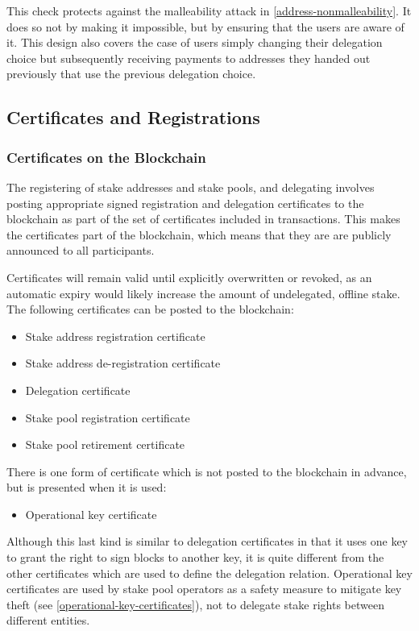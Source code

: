 \documentclass[11pt,a4paper,dvipsnames,twosided]{article}
\begin{document}
This check protects against the malleability attack in
\cref{address-nonmalleability}. It does so not by making it impossible, but
by ensuring that the users are aware of it. This design also covers the case
of users simply changing their delegation choice but subsequently receiving
payments to addresses they handed out previously that use the previous
delegation choice.

\subsection{Certificates and Registrations}
\label{certificates-and-registrations}

\subsubsection{Certificates on the Blockchain}
\label{certificates-on-the-blockchain}

The registering of stake addresses and stake pools, and delegating
involves posting appropriate signed registration and delegation certificates to
the blockchain as part of the set of certificates included in
transactions. This makes the certificates part of
the blockchain, which means that they are are publicly announced to all
participants.

Certificates will remain valid
until explicitly overwritten or revoked, as an automatic expiry would
likely increase the amount of undelegated, offline stake. The following
certificates can be posted to the blockchain:
\begin{itemize}
\item Stake address registration certificate
\item Stake address de-registration certificate
\item Delegation certificate
\item Stake pool registration certificate
\item Stake pool retirement certificate
\end{itemize}
There is one form of certificate which is not posted to the blockchain
in advance, but is presented when it is used:
\begin{itemize}
\item
  Operational key certificate
\end{itemize}
Although this last kind is similar to delegation certificates in that
it uses one key to grant the right to sign blocks to another
key, it is quite different from the other certificates which are used
to define the delegation relation. Operational key certificates are
used by stake pool operators as a safety measure to mitigate key
theft (see \cref{operational-key-certificates}), not to delegate
stake rights between different entities.
\end{document}
